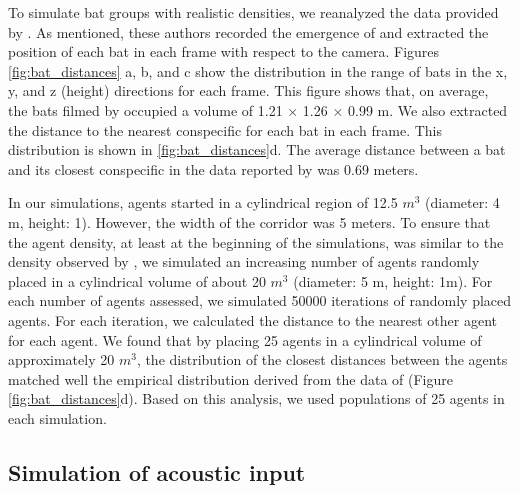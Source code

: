\documentclass[a4paper, 11pt]{article}
\begin{document}
To simulate bat groups with realistic densities, we reanalyzed the data provided by \citet{Weesner2023}. As mentioned, these authors recorded the emergence of  and extracted the position of each bat in each frame with respect to the camera. Figures \ref{fig:bat_distances} a, b, and c show the distribution in the range of bats in the x, y, and z (height) directions for each frame. This figure shows that, on average, the bats filmed by \citet{Weesner2023} occupied a volume of 1.21 $\times$ 1.26 $\times$ 0.99 m. We also extracted the distance to the nearest conspecific for each bat in each frame. This distribution is shown in \ref{fig:bat_distances}d. The average distance between a bat and its closest conspecific in the data reported by \citet{Weesner2023} was 0.69 meters.

In our simulations, agents started in a cylindrical region of 12.5 $m^3$ (diameter: 4 m, height: 1). However, the width of the corridor was 5 meters. To ensure that the agent density, at least at the beginning of the simulations, was similar to the density observed by \citet{Weesner2023}, we simulated an increasing number of agents randomly placed in a cylindrical volume of about 20 $m^3$ (diameter: 5 m, height: 1m). For each number of agents assessed, we simulated 50000 iterations of randomly placed agents. For each iteration, we calculated the distance to the nearest other agent for each agent. We found that by placing 25 agents in a cylindrical volume of approximately 20 $m^3$, the distribution of the closest distances between the agents matched well the empirical distribution derived from the data of \citet{Weesner2023} (Figure \ref{fig:bat_distances}d). Based on this analysis, we used populations of 25 agents in each simulation.

\subsection{Simulation of acoustic input}
\end{document}
